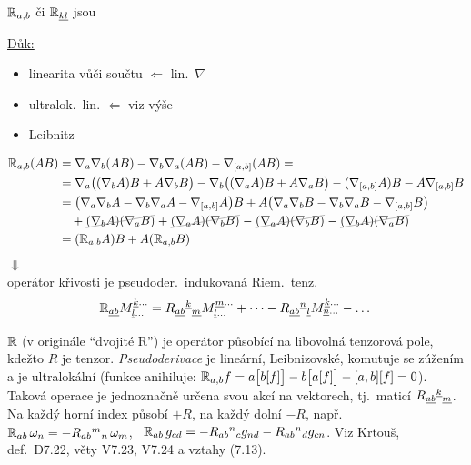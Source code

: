 \begin{veta}[Lemma]
$\mathbb{R}_{a,b}$ či $\mathbb{R}_{\underline{kl}}$ jsou 
\end{veta}
\underline{Důk:}
\begin{itemize}[nosep]
  \item[] linearita vůči součtu \quad $\Leftarrow$ lin.\ $\nabla$
  \item[] ultralok.\ lin. \quad $\Leftarrow$ viz výše
  \item[] Leibnitz
\end{itemize}
\begin{align*}
  \gmIjedenactAR_{a,b}(AB) &= \nabla_a\nabla_b(AB) - \nabla_b\nabla_a(AB) - \nabla_{[a,b]}(AB) = \\
  &= \nabla_a\big((\nabla_b A)B + A\nabla_b B\big) - \nabla_b\big((\nabla_a A)B + A\nabla_a B\big) - (\nabla_{[a,b]}A)B - A\nabla_{[a,b]}B \\
  &= \big(\nabla_a\nabla_b A - \nabla_b\nabla_a A - \nabla_{[a,b]}A\big)B + A\big(\nabla_a\nabla_b B - \nabla_b\nabla_a B - \nabla_{[a,b]}B\big) \\
  &\quad + \gmIjedenactAx{(\nabla_b A)(\nabla_a B)} + \gmIjedenactAx{(\nabla_a A)(\nabla_b B)} - \gmIjedenactAx{(\nabla_a A)(\nabla_b B)} - \gmIjedenactAx{(\nabla_b A)(\nabla_a B)} \\
  &= (\gmIjedenactAR_{a,b}A)B + A(\gmIjedenactAR_{a,b}B)
\end{align*}
$\Downarrow$ \\
operátor křivosti je pseudoder.\ indukovaná Riem.\ tenz.
\[
  \mathbb{R}_{\underline{ab}}M^{\underline{k}\dots}_{\underline{l}\dots}
  = R_{\underline{ab}}{}^{\underline{k}}{}_{\underline{m}}M^{\underline{m}\dots}_{\underline{l}\dots} + \dots
  - R_{\underline{ab}}{}^{\underline{n}}{}_{\underline{l}}M^{\underline{k}\dots}_{\underline{n}\dots} - \dots
\]

\begin{vysvetleni}
$\mathbb{R}$ (v originále ``dvojité R'') je operátor působící na libovolná tenzorová pole, kdežto $R$ je tenzor. \emph{Pseudoderivace} je lineární, Leibnizovské, komutuje se zúžením a je ultralokální (funkce anihiluje: $\mathbb{R}_{a,b}f=a\big[b[f]\big]-b\big[a[f]\big]-[a,b][f]=0$). Taková operace je jednoznačně určena svou akcí na vektorech, tj.\ maticí $R_{\underline{ab}}{}^{\underline{k}}{}_{\underline{m}}$. Na každý horní index působí $+R$, na každý dolní $-R$, např.
$\mathbb{R}_{ab}\,\omega_{n}=-R_{ab}{}^{m}{}_{n}\,\omega_{m}$, \ $\mathbb{R}_{ab}\,g_{cd}=-R_{ab}{}^{n}{}_{c}g_{nd}-R_{ab}{}^{n}{}_{d}g_{cn}$.
Viz Krtouš, def.\ D7.22, věty V7.23, V7.24 a vztahy (7.13).
\end{vysvetleni}

